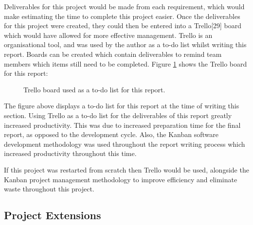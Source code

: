 \documentclass{article}
\begin{document}
Deliverables for this project would be made from each requirement, which would make estimating the time to complete this project easier. Once the deliverables for this project were created, they could then be entered into a Trello[29] board which would have allowed for more effective management. Trello is an organisational tool, and was used by the author as a to-do list whilst writing this report. Boards can be created which contain deliverables to remind team members which items still need to be completed. Figure \ref{figure:trelloBoard} shows the Trello board for this report: 

\begin{figure}[H]
	\centering
	\caption{Trello board used as a to-do list for this report.}
	\label{figure:trelloBoard}
\end{figure}

The figure above displays a to-do list for this report at the time of writing this section. Using Trello as a to-do list for the deliverables of this report greatly increased productivity. This was due to increased preparation time for the final report, as opposed to the development cycle. Also, the Kanban software development methodology was used throughout the report writing process which increased productivity throughout this time. \par

If this project was restarted from scratch then Trello would be used, alongside the Kanban project management methodology to improve efficiency and eliminate waste throughout this project. \par

\subsection{Project Extensions}
\end{document}
